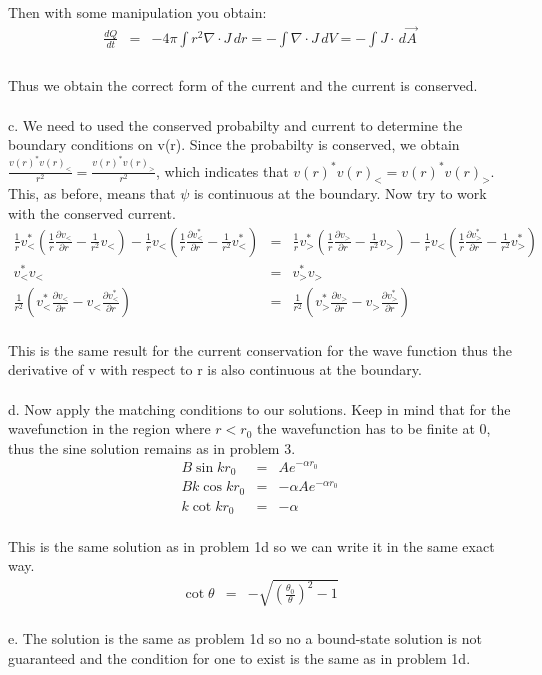 \documentclass[11pt]{amsart}
\begin{document}
Then with some manipulation you obtain: \\
\begin{eqnarray*}
\frac{dQ}{dt}&=& -4\pi\int{r^{2}\nabla\cdot{J}}\,dr = -\int\nabla\cdot{J}\,dV = -\int{J\cdot\,d\vec{A}}\\
\end{eqnarray*} \\
Thus we obtain the correct form of the current and the current is conserved. \\ \\
c. We need to used the conserved probabilty and current to determine the boundary conditions on v(r). Since the probabilty is conserved, we obtain $\frac{v(r)^{*}v(r)_{<}}{r^{2}}=\frac{v(r)^{*}v(r)_{>}}{r^{2}}$, which indicates that $v(r)^{*}v(r)_{<}=v(r)^{*}v(r)_{>}$. This, as before, means that $\psi$ is continuous at the boundary. Now try to work with the conserved current. \\
\begin{eqnarray*} 
\frac{1}{r}v^{*}_{<}(\frac{1}{r}\frac{\partial{v_{<}}}{\partial{r}}-\frac{1}{r^{2}}v_{<})-\frac{1}{r}v_{<}(\frac{1}{r}\frac{\partial{v^{*}_{<}}}{\partial{r}}-\frac{1}{r^{2}}v^{*}_{<}) &=& \frac{1}{r}v^{*}_{>}(\frac{1}{r}\frac{\partial{v_{>}}}{\partial{r}}-\frac{1}{r^{2}}v_{>})-\frac{1}{r}v_{<}(\frac{1}{r}\frac{\partial{v^{*}_{>}}}{\partial{r}}-\frac{1}{r^{2}}v^{*}_{>}) \\
v^{*}_{<}v_{<} &=& v^{*}_{>}v_{>} \\
\frac{1}{r^{2}}(v^{*}_{<}\frac{\partial{v_{<}}}{\partial{r}}-v_{<}\frac{\partial{v^{*}_{<}}}{\partial{r}}) &=& \frac{1}{r^{2}}(v^{*}_{>}\frac{\partial{v_{>}}}{\partial{r}}-v_{>}\frac{\partial{v^{*}_{>}}}{\partial{r}}) 
\end{eqnarray*} \\
This is the same result for the current conservation for the wave function thus the derivative of v with respect to r is also continuous at the boundary. \\ \\
d. Now apply the matching conditions to our solutions. Keep in mind that for the wavefunction in the region where $r<r_{0}$ the wavefunction has to be finite at 0, thus the sine solution remains as in problem 3. \\
\begin{eqnarray*} 
B\sin{kr_{0}} &=& Ae^{-\alpha{r_{0}}} \\
Bk\cos{kr_{0}} &=& -\alpha{A}e^{-\alpha{r_{0}}} \\
k\cot{kr_{0}} &=& -\alpha 
\end{eqnarray*} \\
This is the same solution as in problem 1d so we can write it in the same exact way. \\
\begin{eqnarray*} 
\cot{\theta} &=& -\sqrt{(\frac{\theta_{0}}{\theta})^{2}-1} 
\end{eqnarray*} \\ 
e. The solution is the same as problem 1d so no a bound-state solution is not guaranteed and the condition for one to exist is the same as in problem 1d.  \\
\end{document}
